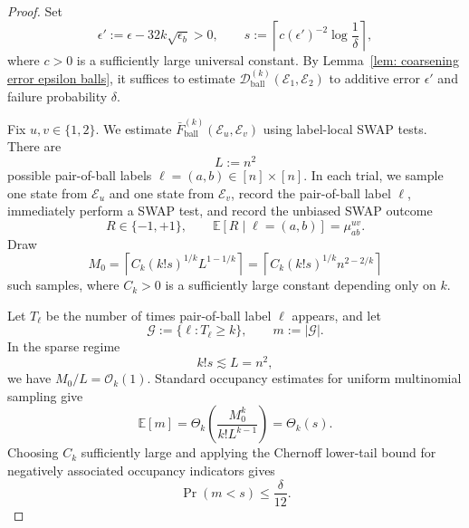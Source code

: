 \documentclass[aps,prx,reprint,superscriptaddress,amsmath,amssymb,longbibliography,floatfix]{revtex4-2}
\newcommand{\dsE}{\mathbb{E}}
\newcommand{\scD}{\mathcal{D}}
\newcommand{\scE}{\mathcal{E}}
\newcommand{\scO}{\mathcal{O}}
\theoremstyle{plain}
\theoremstyle{definition}
\theoremstyle{remark}
\begin{document}
\begin{proof}
    Set
    \begin{equation}
        \epsilon'
        :=
        \epsilon-32k\sqrt{\epsilon_b}>0,
        \qquad
        s
        :=
        \left\lceil
            c(\epsilon')^{-2}\log\frac1\delta
        \right\rceil,
    \end{equation}
    where $c>0$ is a sufficiently large universal constant. By Lemma~\ref{lem: coarsening error epsilon balls}, it suffices to estimate
    $\scD^{(k)}_{\mathrm{ball}}(\scE_1,\scE_2)$ to additive error $\epsilon'$ and failure probability $\delta$.

    Fix $u,v\in\{1,2\}$. We estimate $\bar F^{(k)}_{\mathrm{ball}}(\scE_u,\scE_v)$ using label-local SWAP tests. There are
    \begin{equation}
        L:=n^2
    \end{equation}
    possible pair-of-ball labels $\ell=(a,b)\in[n]\times[n]$. In each trial, we sample one state from $\scE_u$ and one state from $\scE_v$, record the pair-of-ball label $\ell$, immediately perform a SWAP test, and record the unbiased SWAP outcome
    \begin{equation}
        R\in\{-1,+1\},
        \qquad
        \dsE[R\mid \ell=(a,b)]
        =
        \mu_{ab}^{uv}.
    \end{equation}
    Draw
    \begin{equation}
        M_0
        =
        \left\lceil
            C_k(k!s)^{1/k}L^{1-1/k}
        \right\rceil
        =
        \left\lceil
            C_k(k!s)^{1/k}n^{2-2/k}
        \right\rceil
    \end{equation}
    such samples, where $C_k>0$ is a sufficiently large constant depending only on $k$.

    Let $T_\ell$ be the number of times pair-of-ball label $\ell$ appears, and let
    \begin{equation}
        \mathcal G
        :=
        \{\ell:T_\ell\ge k\},
        \qquad
        m:=|\mathcal G|.
    \end{equation}
    In the sparse regime
    \[
        k!s\lesssim L=n^2,
    \]
    we have $M_0/L=\scO_k(1)$. Standard occupancy estimates for uniform multinomial sampling give
    \begin{equation}
        \dsE[m]
        =
        \Theta_k\!\left(
            \frac{M_0^k}{k!L^{k-1}}
        \right)
        =
        \Theta_k(s).
    \end{equation}
    Choosing $C_k$ sufficiently large and applying the Chernoff lower-tail bound for negatively associated occupancy indicators gives
    \begin{equation}
        \Pr(m<s)\le \frac{\delta}{12}.
        \label{eq: local enough pair labels}
    \end{equation}


\end{proof}
\end{document}
